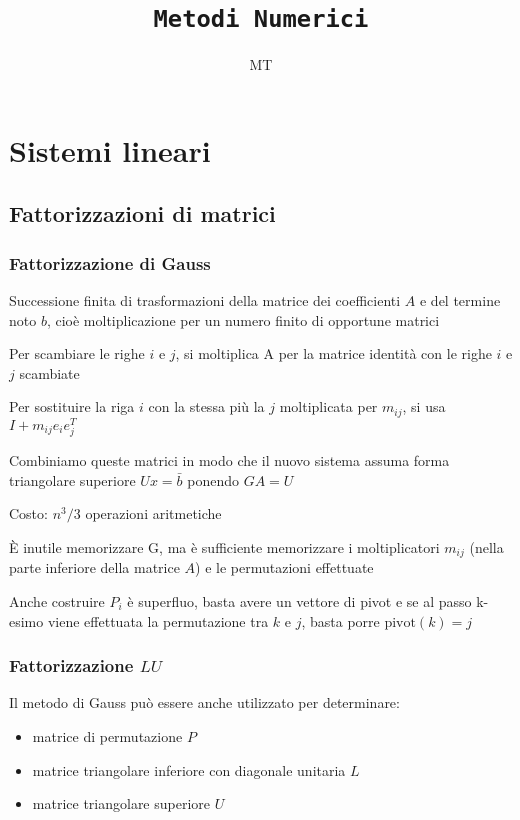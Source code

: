 \documentclass[openany]{book}
\title{\Huge \texttt{Metodi Numerici}}
\date{}
\author{\textsf{MT}}
\begin{document}
\maketitle

\tableofcontents

\chapter{Sistemi lineari}

\section{Fattorizzazioni di matrici}
\subsection{Fattorizzazione di Gauss}

Successione finita di trasformazioni della matrice dei coefficienti $A$ e del termine noto $b$, cioè 
moltiplicazione per un numero finito di opportune matrici

Per scambiare le righe $i$ e $j$, si moltiplica A per la matrice identità con le righe $ i $  e $ j$  scambiate

Per sostituire la riga $ i$ con la stessa più la $ j$ moltiplicata per $m_{ij}$, si usa $ I + m_{ij}e_ie_j^T$

Combiniamo queste matrici in modo che il nuovo sistema assuma forma triangolare superiore $ Ux = \bar{b} $ 
ponendo $ GA = U $

Costo: $ n^3/3$ operazioni aritmetiche

È inutile memorizzare G, ma è sufficiente memorizzare i moltiplicatori $ m_{ij}$ (nella parte inferiore della 
matrice $A$) e le permutazioni effettuate

Anche costruire $P_i$ è superfluo, basta avere un vettore di pivot e se al passo k-esimo viene effettuata la 
permutazione tra $k$ e $j$, basta porre $\text{pivot}(k)=j$
\subsection{Fattorizzazione $LU$}

Il metodo di Gauss può essere anche utilizzato per determinare: 

\begin{itemize}
	\item matrice di permutazione $P$
	\item matrice triangolare inferiore con diagonale unitaria  $L$
	\item matrice triangolare superiore $U$
\end{itemize}
\end{document}
